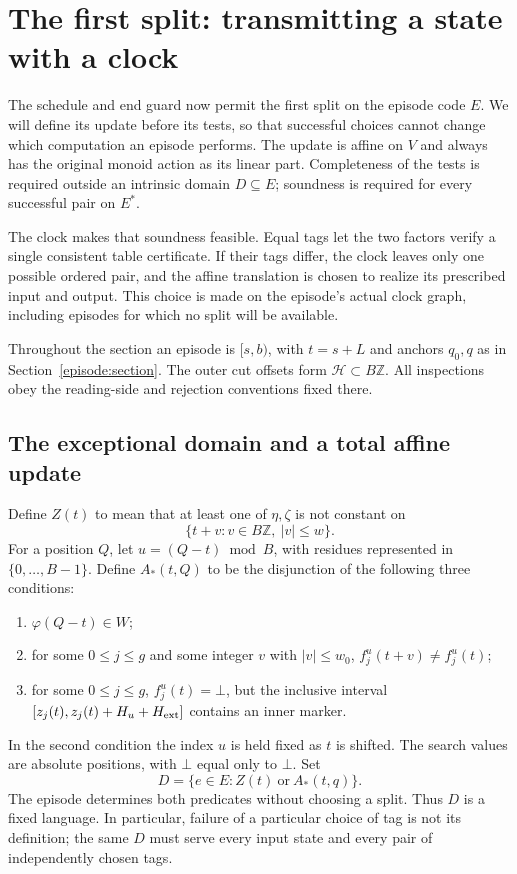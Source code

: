 \section{The first split: transmitting a state with a clock}
\label{outer:section}

The schedule and end guard now permit the first split on the episode
code $E$. We will define its update before its tests, so that successful
choices cannot change which computation an episode performs. The update
is affine on $V$ and always has the original monoid action as its linear
part. Completeness of the tests is required outside an intrinsic domain
$D\subseteq E$; soundness is required for every successful pair on $E^*$.

The clock makes that soundness feasible. Equal tags let the two factors
verify a single consistent table certificate. If their tags differ, the
clock leaves only one possible ordered pair, and the affine translation
is chosen to realize its prescribed input and output. This choice is made
on the episode's actual clock graph, including episodes for which no split
will be available.

Throughout the section an episode is $[s,b)$, with $t=s+L$ and anchors
$q_0,q$ as in Section~\ref{episode:section}. The outer cut offsets form
$\mathcal H\subset B\mathbb Z$. All inspections obey the reading-side
and rejection conventions fixed there.

\subsection{The exceptional domain and a total affine update}

Define $Z(t)$ to mean that at least one of $\eta,\zeta$ is not constant
on
\[
 \{t+v:v\in B\mathbb Z,\ |v|\le w\}.
\]
For a position $Q$, let $u=(Q-t)\bmod B$, with residues represented in
$\{0,\ldots,B-1\}$.  Define $A_*(t,Q)$ to be the disjunction of the
following three conditions:
\begin{enumerate}
\item $\varphi(Q-t)\in W$;
\item for some $0\le j\le g$ and some integer $v$ with $|v|\le w_0$,
      $f_j^u(t+v)\ne f_j^u(t)$;
\item for some $0\le j\le g$, $f_j^u(t)=\bot$, but the inclusive
      interval
      $[z_j(t),z_j(t)+H_u+H_{\rm ext}]$ contains an inner marker.
\end{enumerate}
In the second condition the index $u$ is held fixed as $t$ is shifted.
The search values are absolute positions, with $\bot$ equal only to
$\bot$.  Set
\begin{equation}
 D=\{e\in E: Z(t)\ \text{or}\ A_*(t,q)\}.
 \label{outer:exceptional-domain}
\end{equation}
The episode determines both predicates without choosing a split.
Thus $D$ is a fixed language. In particular, failure of a particular
choice of tag is not its definition; the same $D$ must serve every input
state and every pair of independently chosen tags.

